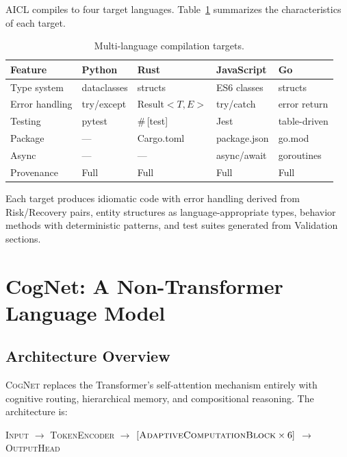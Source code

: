 \documentclass[11pt]{article}
\newcommand{\aicl}{\textsc{AICL}}
\newcommand{\cognet}{\textsc{CogNet}}
\begin{document}
\aicl{} compiles to four target languages. Table~\ref{tab:targets} summarizes the characteristics of each target.

\begin{table}[htbp]
\centering
\caption{Multi-language compilation targets.}
\label{tab:targets}
\begin{tabular}{@{}lllll@{}}
\toprule
\textbf{Feature} & \textbf{Python} & \textbf{Rust} & \textbf{JavaScript} & \textbf{Go} \\
\midrule
Type system   & dataclasses     & structs        & ES6 classes        & structs \\
Error handling & try/except     & Result$<T,E>$  & try/catch          & error return \\
Testing       & pytest          & \#\,[test]     & Jest               & table-driven \\
Package       & ---             & Cargo.toml     & package.json       & go.mod \\
Async         & ---             & ---            & async/await        & goroutines \\
Provenance    & Full            & Full           & Full               & Full \\
\bottomrule
\end{tabular}
\end{table}

Each target produces idiomatic code with error handling derived from Risk/Recovery pairs, entity structures as language-appropriate types, behavior methods with deterministic patterns, and test suites generated from Validation sections.

\section{CogNet: A Non-Transformer Language Model}
\label{sec:cognet}

\subsection{Architecture Overview}
\label{sec:cognet:overview}

\cognet{} replaces the Transformer's self-attention mechanism entirely with cognitive routing, hierarchical memory, and compositional reasoning. The architecture is:

\begin{center}
\textsc{Input} $\to$ \textsc{TokenEncoder} $\to$ $[\textsc{AdaptiveComputationBlock} \times 6]$ $\to$ \textsc{OutputHead}
\end{center}
\end{document}
